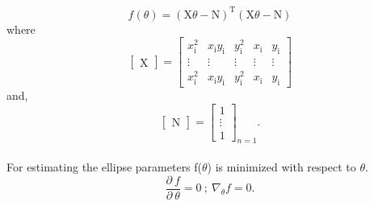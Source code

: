 \begin{equation}
	f(\theta)=(\text{X} \theta - \text{N})^{\text{T}} (\text{X} \theta - \text{N})
\end{equation}
where
\begin{equation}
	\begin{bmatrix}
		\text{X} 
		
	\end{bmatrix}=
	\begin{bmatrix}
		x_{\text{i}}^{2} & x_\text{i}y_\text{i} & y_{\text{i}}^{2} & x_{\text{i}}&y_{\text{i}}\\
		\vdots&\vdots&\vdots&\vdots&\vdots\\
		x_{\text{i}}^{2} & x_\text{i}y_\text{i} & y_{\text{i}}^{2} & x_{\text{i}}&y_{\text{i}}
	\end{bmatrix}
\end{equation}\label{equvector}
and,
\begin{equation}
	\begin{bmatrix}
		\text{N} 
		
	\end{bmatrix}=
	\begin{bmatrix}
		1\\
		\vdots\\
		1
	\end{bmatrix}_{n=1}.
\end{equation}\\
For estimating the ellipse parameters f($\theta$) is minimized with respect to $\theta$.
\begin{equation} 
	\frac{\partial~f}{\partial~\theta}=0 ~ ; ~\nabla_{\theta} f=0 .
\end{equation} 


